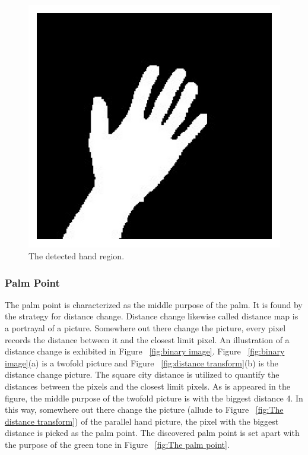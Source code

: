 \documentclass[a4paper]{article}
\begin{document}
\begin{figure}[h!]
 \begin{center}
  \includegraphics[scale=1.7]{fig3}
  \caption{The detected hand region.}
  \label{fig:hand region}
 \end{center}
\end{figure}



\subsubsection{Palm Point}
The palm point is characterized as the middle purpose of the palm. It is found by the strategy for distance change. Distance change likewise called distance map is a portrayal of a picture. Somewhere out there change the picture, every pixel records the distance between it and the closest limit pixel. An illustration of a distance change is exhibited in Figure ~\ref{fig:binary image}. Figure ~\ref{fig:binary image}(a) is a twofold picture and Figure ~\ref{fig:distance transform}(b) is the distance change picture. The square city distance is utilized to quantify the distances between the pixels and the closest limit pixels. As is appeared in the figure, the middle purpose of the twofold picture is with the biggest distance 4. In this way, somewhere out there change the picture (allude to Figure ~\ref{fig:The distance transform}) of the parallel hand picture, the pixel with the biggest distance is picked as the palm point. The discovered palm point is set apart with the purpose of the green tone in Figure ~\ref{fig:The palm point}.
\end{document}
